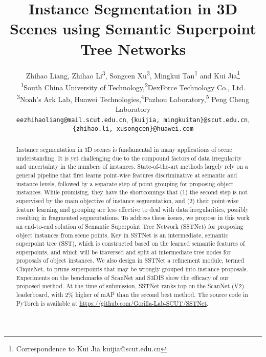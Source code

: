 \documentclass[10pt,twocolumn,letterpaper]{article}
\begin{document}
\setlength{\textfloatsep}{6pt}
\setlength{\intextsep}{6pt}

\title{Instance Segmentation in 3D Scenes using Semantic Superpoint Tree Networks}

\author{Zhihao Liang,
Zhihao Li\textsuperscript{3}, Songcen Xu\textsuperscript{3},
Mingkui Tan\textsuperscript{1} and Kui Jia\thanks{Correspondence to Kui Jia kuijia@scut.edu.cn}\\
\textsuperscript{1}South China University of Technology,\quad \textsuperscript{2}DexForce Technology Co., Ltd. \\
\textsuperscript{3}Noah's Ark Lab, Huawei Technologies,\quad \textsuperscript{4}Pazhou Laboratory,\quad \textsuperscript{5} Peng Cheng Laboratory\\
{\tt\small  eezhihaoliang@mail.scut.edu.cn},
{\tt\small \{kuijia, mingkuitan\}@scut.edu.cn}, \\
{\tt\small \{zhihao.li, xusongcen\}@huawei.com}
}

\maketitle
\ificcvfinal\thispagestyle{empty}\fi

\begin{abstract}
   Instance segmentation in 3D scenes is fundamental in many applications of scene understanding. It is yet challenging due to the compound factors of data irregularity and uncertainty in the numbers of instances. State-of-the-art methods largely rely on a general pipeline that first learns point-wise features discriminative at semantic and instance levels, followed by a separate step of point grouping for proposing object instances. While promising, they have the shortcomings that (1) the second step is not supervised by the main objective of instance segmentation, and (2) their point-wise feature learning and grouping are less effective to deal with data irregularities, possibly resulting in fragmented segmentations. To address these issues, we propose in this work an end-to-end solution of Semantic Superpoint Tree Network (SSTNet) for proposing object instances from scene points. Key in SSTNet is an intermediate, semantic superpoint tree (SST), which is constructed based on the learned semantic features of superpoints, and which will be traversed and split at intermediate tree nodes for proposals of object instances. We also design in SSTNet a refinement module, termed CliqueNet, to prune superpoints that may be wrongly grouped into instance proposals. Experiments on the benchmarks of ScanNet and S3DIS show the efficacy of our proposed method. At the time of submission, SSTNet ranks top on the ScanNet (V2) leaderboard, with 2\% higher of mAP than the second best method. The source code in PyTorch is available at \url{https://github.com/Gorilla-Lab-SCUT/SSTNet}.
\end{abstract}
\end{document}
